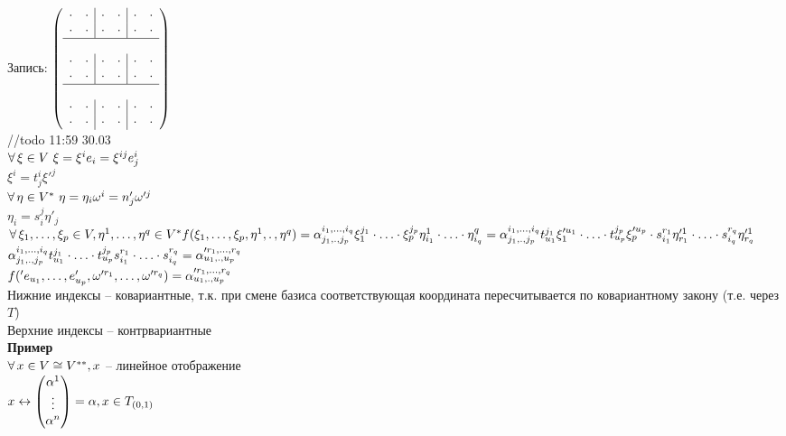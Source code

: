 \documentclass[12pt]{article}
\begin{document}
Запись: $\left(\begin{array}{cc|cc|cc}
    \cdot & \cdot & \cdot & \cdot & \cdot & \cdot\\
    \cdot & \cdot & \cdot & \cdot & \cdot & \cdot\\
    \hline\\
    \cdot & \cdot & \cdot & \cdot & \cdot & \cdot\\
    \cdot & \cdot & \cdot & \cdot & \cdot & \cdot\\
    \hline\\
    \cdot & \cdot & \cdot & \cdot & \cdot & \cdot\\
    \cdot & \cdot & \cdot & \cdot & \cdot & \cdot
\end{array}\right)$\\
//todo 11:59 30.03\\
$\forall\, \xi \in V\ \xi = \xi^i e_i = \xi^{ij}e^i_j$\\
$\xi^i = t^i_j \xi'^j$\\
$\forall\, \eta \in V^*\ \eta=\eta_i \omega^i =n'_j \omega'^j$\\
$\eta_i = s_i^j \eta'_j$\\
$\forall\, \xi_1, \ldots, \xi_p \in V, \eta^1,\ldots,\eta^q \in V^* f(\xi_1, \ldots, \xi_p, \eta^1, \ldotp, \eta^q) = \alpha_{j_1, \ldotp, j_p}^{i_1, \ldots, i_q} \xi_1^{j_1}\cdot \ldots \cdot \xi_p^{j_p} \eta_{i_1}^1\cdot\ldots\cdot \eta_{i_q}^q = \alpha_{j_1, \ldotp, j_p}^{i_1, \ldots, i_q} t_{u_1}^{j_1}\xi_1'^{u_1} \cdot \ldots \cdot t_{u_p}^{j_p}\xi_p'^{u_p} \cdot s_{i_1}^{r_1}\eta'^1_{r_1} \cdot \ldots\cdot s_{i_q}^{r_q}\eta'^1_{r_q}$\\
$\alpha_{j_1, \ldotp, j_p}^{i_1, \ldots, i_q} t_{u_1}^{j_1}\cdot\ldots\cdot t_{u_p}^{j_p} s_{i_1}^{r_1} \cdot \ldots \cdot s_{i_q}^{r_q} = \alpha'^{r_1, \ldots, r_q}_{u_1, \ldotp, u_p}$\\
$f('e_{u_1}, \ldots, e'_{u_p}, \omega'^{r_1},\ldots, \omega'^{r_q}) = \alpha'^{r_1, \ldots, r_q}_{u_1, \ldotp, u_p}$\\
Нижние индексы -- ковариантные, т.к. при смене базиса соответствующая координата пересчитывается по ковариантному закону (т.е. через $T$)\\
Верхние индексы -- контрвариантные\\
\textbf{Пример}\\
$\forall\, x \in V \cong V^{**}, x$ -- линейное отображение\\
$x \leftrightarrow \begin{pmatrix}
    \alpha^1\\\vdots\\\alpha^n
\end{pmatrix} = \alpha, x \in T_{(0,1)}$\\
\end{document}
